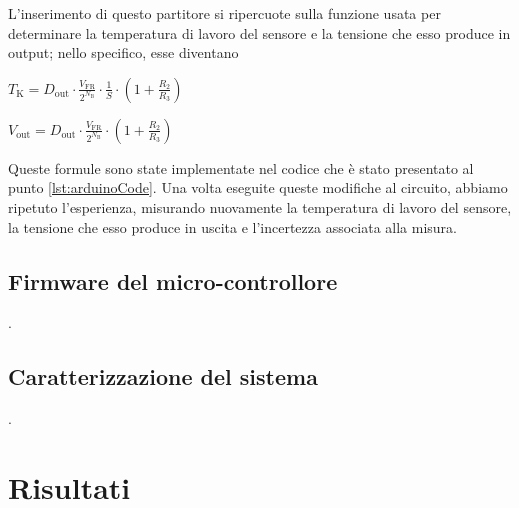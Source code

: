 \documentclass[a4paper]{article}
\begin{document}
			\newline
			L'inserimento di questo partitore si ripercuote sulla funzione usata per determinare la temperatura di lavoro del sensore e la tensione che esso produce in output; nello specifico, esse diventano
			\begin{center}
				$ T_{\mathrm{K}} = D_{\mathrm{out}} \cdot \frac{V_{\mathrm{FR}}}{2^{N_{\mathrm{B}}}} \cdot \frac{1}{S} \cdot (1 + \frac{R_{2}}{R_{3}}) $
			\end{center}
			\begin{center}
				$ V_{\mathrm{out}} = D_{\mathrm{out}} \cdot \frac{V_{\mathrm{FR}}}{2^{N_{\mathrm{B}}}} \cdot (1 + \frac{R_{2}}{R_{3}}) $
			\end{center}
			Queste formule sono state implementate nel codice che è stato presentato al punto \ref{lst:arduinoCode}.
			\newline
			Una volta eseguite queste modifiche al circuito, abbiamo ripetuto l'esperienza, misurando nuovamente la temperatura di lavoro del sensore, la tensione che esso produce in uscita e l'incertezza associata alla misura.
		\subsection{Firmware del micro-controllore}
			.
		\subsection{Caratterizzazione del sistema}
			.
	\section{Risultati}
\end{document}
